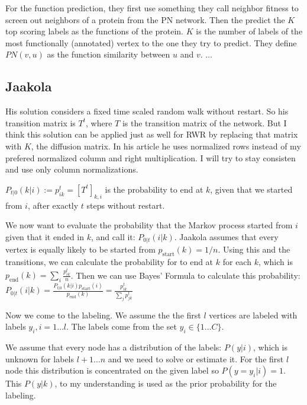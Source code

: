 \documentclass[10pt]{article}
\theoremstyle{definition}
\theoremstyle{remark}
\theoremstyle{plain}
\begin{document}
For the function prediction, they first use something they call
neighbor fitness to screen out neighbors of a protein from the PN
network. Then the predict the $K$ top scoring labels as the
functions of the protein. $K$ is the number of labels 
of the most functionally 
(annotated) vertex to the one they try to predict.
They define $PN(v,u)$ as the function similarity between $u$ and
$v$.
$\dots$



\subsection{Jaakola}

His solution considers a fixed time scaled random walk without
restart. So his transition matrix is $T^t$, where $T$ is the
transition matrix of the network. But I think this solution can be
applied just as well for RWR by replacing that matrix with $K$, the
diffusion matrix. In his article he uses normalized rows instead of
my prefered normalized column and right multiplication.  I will
try to stay consisten and use only column normalizations.

$P_{t | 0}(k | i):= p^t_{ik} = [T^t]_{k,i}$ 
is the probability to end at $k$, given that we
started from $i$, after exactly $t$ steps without restart.

We now want to evaluate the probability that the 
Markov process started from $i$ given that it ended
in $k$, and call it: $P_{0 | t}(i | k)$. 
Jaakola assumes that every vertex is equally likely to be started
from $p_{\text{start}}(k) = 1/n$. Using this and the transitions,
we can calculate the probability for to end at $k$ for each $k$, 
which is $p_{\text{end}}(k) = \sum_i \frac{p^t_{ik}}{n}$.
Then 
we can use Bayes' Formula
to calculate this probability:
$P_{0 | t}(i | k) = 
\frac{P_{t | 0}(k | i) p_{\text{start}}(i)}{p_{\text{end}}(k)} 
= \frac{p^t_{ik}}{\sum_j p^t_{jk}}
$

Now we come to the labeling. We assume the the first
$l$ vertices are labeled with labels $y_i, i = 1 \dots l$.
The labels come from the set $y_i \in \{1 \dots C\}$.

We assume that every node has a distribution of the labels:
$P(y | i)$, which is unknown for labels $l+1 \dots n$ and we 
need to solve or estimate it. For the first $l$ node this distribution is
concentrated on the given label so $P(y=y_i | i) = 1$.
This $P(y | k)$, to my understanding is used as the prior
probability for the labeling.
\end{document}
